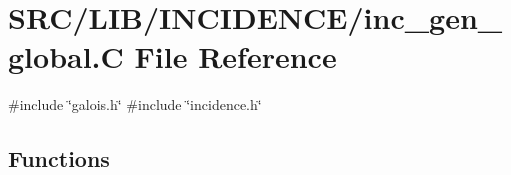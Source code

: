 \hypertarget{inc__gen__global_8_c}{}\section{S\+R\+C/\+L\+I\+B/\+I\+N\+C\+I\+D\+E\+N\+C\+E/inc\+\_\+gen\+\_\+global.C File Reference}
\label{inc__gen__global_8_c}
{\ttfamily \#include \char`\"{}galois.\+h\char`\"{}}\newline
{\ttfamily \#include \char`\"{}incidence.\+h\char`\"{}}\newline
\subsection*{Functions}
